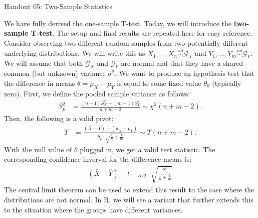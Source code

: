 \documentclass{tufte-handout}
\newcommand{\iid}{\stackrel{iid}{\sim}}
\begin{document}
\justify

{\LARGE Handout 05: Two-Sample Statistics}

\vspace*{18pt}

\noindent
We have fully derived the one-sample T-test. Today, we will introduce the
\textbf{two-sample T-test}. The setup and final results are repeated here
for easy reference. Consider observing two different random samples from
two potentially different underlying distributions. We will write this as
$X_1, \ldots, X_n \iid \mathcal{G}_X$ and $Y_1, \ldots, Y_m \iid \mathcal{G}_Y$. We will assume that both
$\mathcal{G}_X$ and $\mathcal{G}_Y$ are normal and that they have a shared
common (but unknown) variance $\sigma^2$. We want to produce an hypothesis
test that the difference in means $\theta = \mu_X - \mu_Y$ is equal to some
fixed value $\theta_0$ (typically zero). First, we define the pooled sample
variance as follows: 
\begin{align*}
S_p^2 &= \frac{(n-1) S_X^2 + (m - 1) S_Y^2}{n + m - 2} \sim \chi^2(n + m - 2).
\end{align*}
Then, the following is a valid pivot:
\begin{align*}
T &= \frac{(\bar{X} - \bar{Y}) - (\mu_X - \mu_Y)}{S_p \cdot \sqrt{\frac{1}{n} + \frac{1}{m}}} \sim T(n + m - 2).
\end{align*}
With the null value of $\theta$ plugged in, we get a valid test statistic.
The corresponding confidence inverval for the difference means is:
\begin{align*}
(\bar{X} - \bar{Y}) \pm t_{1 - \alpha/2} \cdot \sqrt{\frac{S_p^2}{\frac{1}{n} + \frac{1}{m}}}
\end{align*}
The central limit theorem can be used to extend this result to the case where
the distributions are not normal. In R, we will see a variant that further extends
this to the situation where the groups have different variances.
\end{document}
